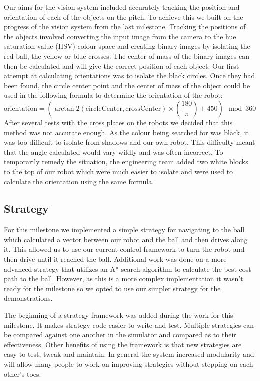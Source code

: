 \documentclass[12pt, a4paper, titlepage]{article}
\begin{document}
Our aims for the vision system included accurately tracking the position and
orientation of each of the objects on the pitch. To achieve this we built on the
progress of the vision system from the last milestone. Tracking the positions
of the objects involved converting the input image from the camera to the hue
saturation value (HSV) colour space and creating binary images by isolating the
red ball, the yellow or blue crosses. The center of mass of the binary images
can then be calculated and will give the correct position of each object. Our
first attempt at calculating orientations was to isolate the black circles.
Once they had been found, the circle center point and the center of mass of the
object could be used in the following formula to determine the orientation of
the robot:
\begin{equation*}
\mbox{orientation} = (\arctan2(\mbox{circleCenter}, \mbox{crossCenter}) \times \left(\frac{180}{\pi}\right) + 450) \mod 360
\end{equation*}
After several tests with the cross plates on the robots we
decided that this method was not accurate enough. As the colour being searched
for was black, it was too difficult to isolate from shadows and our own robot.
This difficulty meant that the angle calculated would vary wildly and was often
incorrect. To temporarily remedy the situation, the engineering team added two
white blocks to the top of our robot which were much easier to isolate and were
used to calculate the orientation using the same formula.

\subsection{Strategy}

For this milestone we implemented a simple strategy for navigating to the ball
which calculated a vector between our robot and the ball and then drives along
it. This allowed us to use our current control framework to turn the robot
and then drive until it reached the ball. Additional work was done on a more
advanced strategy that utilizes an A* search algorithm to calculate the best
cost path to the ball. However, as this is a more complex implementation it
wasn't ready for the milestone so we opted to use our simpler strategy for the
demonstrations.

The beginning of a strategy framework was added during the work for this
milestone. It makes strategy code easier to write and test. Multiple strategies
can be compared against one another in the simulator and compared as to their
effectiveness. Other benefits of using the framework is that new strategies are
easy to test, tweak and maintain. In general the system increased modularity and
will allow many people to work on improving strategies without stepping on each
other's toes.
\end{document}
